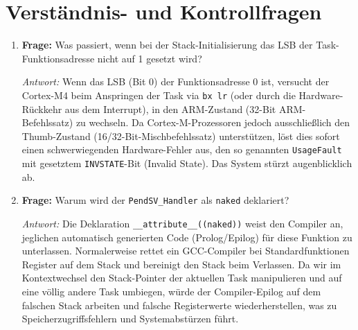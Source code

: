 \section{Verständnis- und Kontrollfragen}
\begin{enumerate}
    \item \textbf{Frage:} Was passiert, wenn bei der Stack-Initialisierung das LSB der Task-Funktionsadresse nicht auf 1 gesetzt wird?
    
    \textit{Antwort:} Wenn das LSB (Bit 0) der Funktionsadresse 0 ist, versucht der Cortex-M4 beim Anspringen der Task via \lstinline|bx lr| (oder durch die Hardware-Rückkehr aus dem Interrupt), in den ARM-Zustand (32-Bit ARM-Befehlssatz) zu wechseln. Da Cortex-M-Prozessoren jedoch ausschließlich den Thumb-Zustand (16/32-Bit-Mischbefehlssatz) unterstützen, löst dies sofort einen schwerwiegenden Hardware-Fehler aus, den so genannten \lstinline|UsageFault| mit gesetztem \lstinline|INVSTATE|-Bit (Invalid State). Das System stürzt augenblicklich ab.
    
    \item \textbf{Frage:} Warum wird der \lstinline|PendSV_Handler| als \lstinline|naked| deklariert?
    
    \textit{Antwort:} Die Deklaration \lstinline|__attribute__((naked))| weist den Compiler an, jeglichen automatisch generierten Code (Prolog/Epilog) für diese Funktion zu unterlassen. Normalerweise rettet ein GCC-Compiler bei Standardfunktionen Register auf dem Stack und bereinigt den Stack beim Verlassen. Da wir im Kontextwechsel den Stack-Pointer der aktuellen Task manipulieren und auf eine völlig andere Task umbiegen, würde der Compiler-Epilog auf dem falschen Stack arbeiten und falsche Registerwerte wiederherstellen, was zu Speicherzugriffsfehlern und Systemabstürzen führt.
\end{enumerate}
